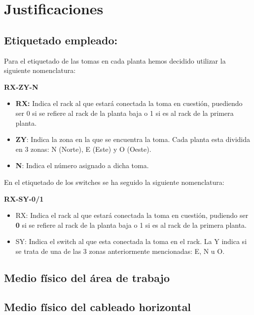 \section{Justificaciones}
\subsection{\textbf{Etiquetado empleado: }}
Para el etiquetado de las tomas en cada planta hemos decidido utilizar la siguiente nomenclatura:
\begin{center}
    \textbf{RX-ZY-N}
\end{center}

\begin{itemize}
    \item \textbf{RX:} Indica el rack al que estará conectada la toma en cuestión, puediendo ser 0 si se refiere al rack de la planta baja o 1 si es al rack de la primera planta.
    \item \textbf{ZY}: Indica la zona en la que se encuentra la toma. Cada planta esta dividida en 3 zonas: N (Norte), E (Este) y O (Oeste).
    \item \textbf{N}: Indica el número asignado a dicha toma.
\end{itemize}

En el etiquetado de los switches se ha seguido la siguiente nomenclatura:

\begin{center}
    \textbf{RX-SY-0/1}
\end{center}

\begin{itemize}
    \item RX: Indica el rack al que estará conectada la toma en cuestión, pudiendo ser \textbf{0} si se refiere al rack de la planta baja o 1 si es al rack de la primera planta.
    \item SY: Indica el switch al que esta conectada la toma en el rack. La Y indica si se trata de una de las 3 zonas anteriormente mencionadas: E, N u O.
\end{itemize}

\subsection{Medio físico del área de trabajo}
\subsection{Medio físico del cableado horizontal}
